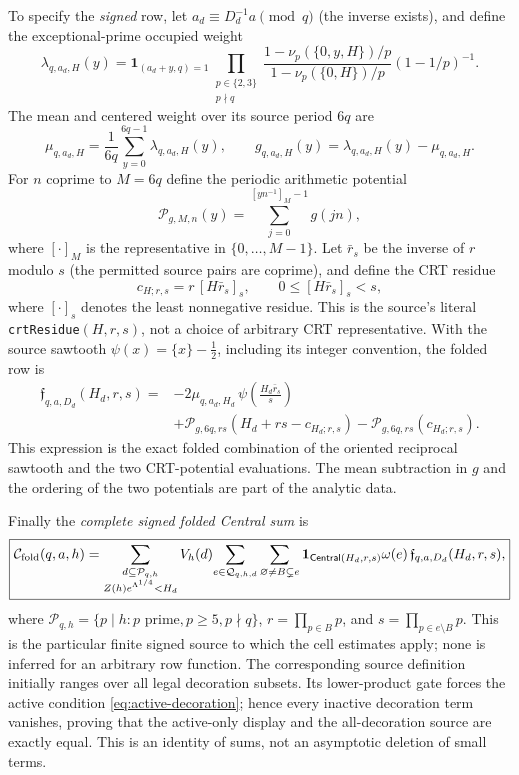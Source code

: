 \documentclass[11pt]{article}
\theoremstyle{definition}
\theoremstyle{remark}
\newcommand{\1}{\mathbf 1}
\begin{document}
To specify the \emph{signed} row, let $a_d\equiv D_d^{-1}a\pmod q$
(the inverse exists), and define the exceptional-prime occupied weight
\[
 \lambda_{q,a_d,H}(y)=\mathbf1_{(a_d+y,q)=1}
 \prod_{\substack{p\in\{2,3\}\\p\nmid q}}
 \frac{1-\nu_p(\{0,y,H\})/p}{1-\nu_p(\{0,H\})/p}
 (1-1/p)^{-1}.
\]
The mean and centered weight over its source period $6q$ are
\[
 \mu_{q,a_d,H}=\frac1{6q}\sum_{y=0}^{6q-1}\lambda_{q,a_d,H}(y),
 \qquad g_{q,a_d,H}(y)=\lambda_{q,a_d,H}(y)-\mu_{q,a_d,H}.
\]
For $n$ coprime to $M=6q$ define the periodic arithmetic potential
\[
 \mathcal P_{g,M,n}(y)=\sum_{j=0}^{[yn^{-1}]_M-1}g(jn),
\]
where $[\cdot]_M$ is the representative in $\{0,\ldots,M-1\}$.
Let $\bar r_s$ be the inverse of $r$ modulo $s$ (the
permitted source pairs are coprime), and define the CRT residue
\[
 c_{H;r,s}=r\,[H\bar r_s]_s,\qquad 0\le [H\bar r_s]_s<s,
\]
where $[\cdot]_s$ denotes the least nonnegative residue.  This
is the source's literal \texttt{crtResidue}$(H,r,s)$, not a
choice of arbitrary CRT representative.  With the
source sawtooth $\psi(x)=\{x\}-\frac12$, including its
integer convention, the folded row is
\begin{equation}\label{eq:folded-row-contract}
\begin{split}
 \mathfrak f_{q,a,D_d}(H_d,r,s)
   ={}&-2\mu_{q,a_d,H_d}\,
      \psi\!\left(\frac{H_d\bar r_s}s\right)\\
     &+\mathcal P_{g,6q,rs}(H_d+rs-c_{H_d;r,s})
       -\mathcal P_{g,6q,rs}(c_{H_d;r,s}).
\end{split}
\end{equation}
This expression is the exact folded combination of the oriented
reciprocal sawtooth and the two CRT-potential evaluations. The
mean subtraction in $g$ and the ordering of the two potentials
are part of the analytic data.

Finally the \emph{complete signed folded Central sum} is
\begin{equation}\label{eq:physical-source-schema}
\boxed{
 \mathcal C_{\rm fold}(q,a,h)=
 \sum_{\substack{d\subseteq\mathcal P_{q,h}\\Z(h)e^{\Lambda^{1/4}}<H_d}}
 V_h(d)\!
 \sum_{e\in\mathcal Q_{q,h,d}}
 \sum_{\varnothing\ne B\subsetneq e}
 \mathbf1_{\mathsf{Central}(H_d,r,s)}
 \omega(e)\,\mathfrak f_{q,a,D_d}(H_d,r,s),
}
\end{equation}
where $\mathcal P_{q,h}=\{p\mid h:p\text{ prime},p\ge5,p\nmid q\}$,
$r=\prod_{p\in B}p$, and $s=\prod_{p\in e\setminus B}p$.
This is the particular finite signed source to which the cell
estimates apply; none is inferred for an arbitrary row function.
The corresponding source definition initially ranges over all legal
decoration subsets. Its lower-product gate forces the active condition
\eqref{eq:active-decoration}; hence every inactive decoration term
vanishes, proving that the active-only display and the all-decoration
source are exactly equal. This is an identity of sums, not an
asymptotic deletion of small terms.
\end{document}
